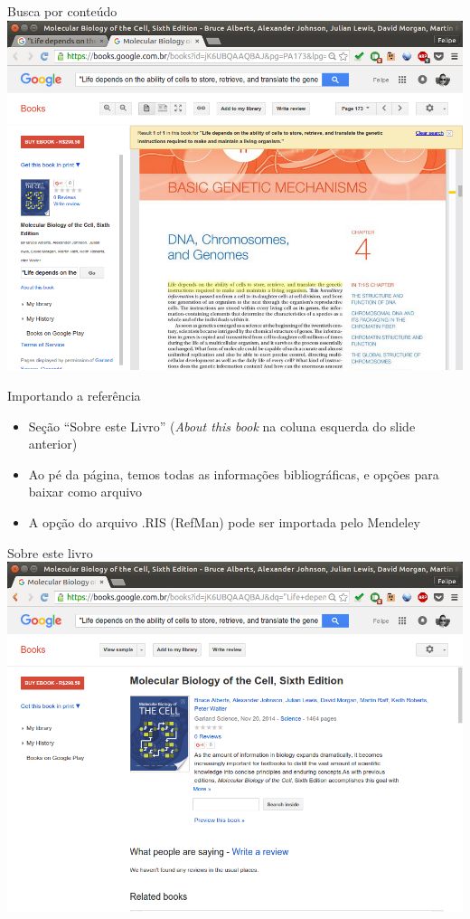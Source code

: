 \documentclass{beamer}
\begin{document}
\begin{frame}{Busca por conteúdo}
  \centering
  \includegraphics[height=.85\textheight]{Busca/gbooks-busca-conteudo}
\end{frame}

\begin{frame}{Importando a referência}
  \begin{itemize}
    \footnotesize
  \item Seção ``Sobre este Livro'' ({\em About this book} na coluna
    esquerda do slide anterior)
  \item Ao pé da página, temos todas as informações bibliográficas, e
    opções para baixar como arquivo
  \item A opção do arquivo .RIS (RefMan) pode ser importada pelo
    Mendeley
  \end{itemize}
\end{frame}

\begin{frame}{Sobre este livro}
  \centering
  \includegraphics[height=.85\textheight]{Busca/gbooks-about1}
\end{frame}
\end{document}
